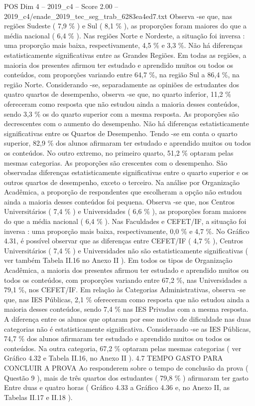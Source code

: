 \begin{textsample}{POS Dim 4 – 2019\_c4 – Score 2.00 – 2019\_c4/enade\_2019\_tec\_seg\_trab\_6283ea4ed7.txt}
Observa -se que, nas regiões Sudeste ( 7,9 \% ) e Sul ( 8,1 \% ), as proporções foram maiores do que a média nacional ( 6,4 \% ).
Nas regiões Norte e Nordeste, a situação foi inversa : uma proporção mais baixa, respectivamente, 4,5 \% e 3,3 \%.
Não há diferenças estatisticamente significativas entre as Grandes Regiões.
Em todas as regiões, a maioria dos presentes afirmou ter estudado e aprendido muitos ou todos os conteúdos, com proporções variando entre 64,7 \%, na região Sul a 86,4 \%, na região Norte.
Considerando -se, separadamente as opiniões de estudantes dos quatro quartos de desempenho, observa -se que, no quarto inferior, 11,2 \% ofereceram como resposta que não estudou ainda a maioria desses conteúdos, sendo 3,3 \% os do quarto superior com a mesma resposta.
As proporções são decrescentes com o aumento do desempenho.
Não há diferenças estatisticamente significativas entre os Quartos de Desempenho.
Tendo -se em conta o quarto superior, 82,9 \% dos alunos afirmaram ter estudado e aprendido muitos ou todos os conteúdos.
No outro extremo, no primeiro quarto, 51,2 \% optaram pelas mesmas categorias.
As proporções são crescentes com o desempenho.
São observadas diferenças estatisticamente significativas entre o quarto superior e os outros quartos de desempenho, exceto o terceiro.
Na análise por Organização Acadêmica, a proporção de respondentes que escolheram a opção não estudou ainda a maioria desses conteúdos foi pequena.
Observa -se que, nos Centros Universitários ( 7,4 \% ) e Universidades ( 6,6 \% ), as proporções foram maiores do que a média nacional ( 6,4 \% ).
Nas Faculdades e CEFET/IF, a situação foi inversa : uma proporção mais baixa, respectivamente, 0,0 \% e 4,7 \%.
No Gráfico 4.31, é possível observar que as diferenças entre CEFET/IF ( 4,7 \% ), Centros Universitários ( 7,4 \% ) e Universidades não são estatisticamente significativas ( ver também Tabela II.16 no Anexo II ).
Em todos os tipos de Organização Acadêmica, a maioria dos presentes afirmou ter estudado e aprendido muitos ou todos os conteúdos, com proporções variando entre 67,2 \%, nas Universidades a 79,1 \%, nos CEFET/IF.
Em relação às Categorias Administrativas, observa -se que, nas IES Públicas, 2,1 \% ofereceram como resposta que não estudou ainda a maioria desses conteúdos, sendo 7,4 \% nas IES Privadas com a mesma resposta.
A diferença entre os alunos que optaram por esse motivo de dificuldade nas duas categorias não é estatisticamente significativa.
Considerando -se as IES Públicas, 74,7 \% dos alunos afirmaram ter estudado e aprendido muitos ou todos os conteúdos.
Na outra categoria, 67,2 \% optaram pelas mesmas categorias ( ver Gráfico 4.32 e Tabela II.16, no Anexo II ). 4.7 TEMPO GASTO PARA CONCLUIR A PROVA Ao responderem sobre o tempo de conclusão da prova ( Questão 9 ), mais de três quartos dos estudantes ( 79,8 \% ) afirmaram ter gasto Entre duas e quatro horas ( Gráfico 4.33 a Gráfico 4.36 e, no Anexo II, as Tabelas II.17 e II.18 ).

\end{textsample}
